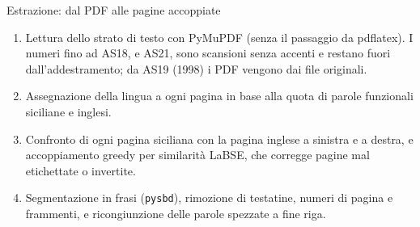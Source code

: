 \documentclass[aspectratio=169]{beamer}
\newcommand{\T}[2]{#2}
\newcommand{\T}[2]{#1}
\begin{document}
\begin{frame}{\T{Extraction: from PDF to paired pages}{Estrazione: dal PDF alle pagine accoppiate}}
  \begin{enumerate}
    \item \T{Read the text layer with PyMuPDF (no pdflatex round trip). The issues up to AS18,
          and AS21, are scans without accents, and are kept out of training; from AS19 (1998)
          the PDFs come from the original files.}%
          {Lettura dello strato di testo con PyMuPDF (senza il passaggio da pdflatex). I numeri
          fino ad AS18, e AS21, sono scansioni senza accenti e restano fuori
          dall'addestramento; da AS19 (1998) i PDF vengono dai file originali.}
    \item \T{Assign each page a language by its share of Sicilian and English stop-words.}%
          {Assegnazione della lingua a ogni pagina in base alla quota di parole funzionali
          siciliane e inglesi.}
    \item \T{Compare each Sicilian page with the English page on either side and pair them
          greedily by LaBSE similarity, which corrects mislabelled or swapped pages.}%
          {Confronto di ogni pagina siciliana con la pagina inglese a sinistra e a destra, e
          accoppiamento greedy per similarit\`a LaBSE, che corregge pagine mal etichettate o
          invertite.}
    \item \T{Segment into sentences (\texttt{pysbd}), drop running headers, page numbers and
          fragments, and rejoin hyphenated words.}%
          {Segmentazione in frasi (\texttt{pysbd}), rimozione di testatine, numeri di pagina e
          frammenti, e ricongiunzione delle parole spezzate a fine riga.}
  \end{enumerate}
\end{frame}
\end{document}
